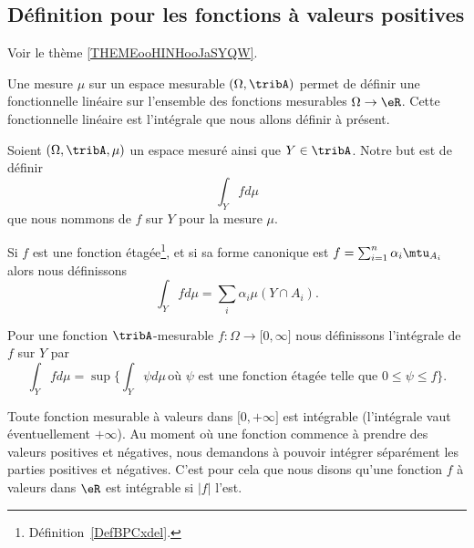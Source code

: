 \subsection{Définition pour les fonctions à valeurs positives}

Voir le thème \ref{THEMEooHINHooJaSYQW}.

Une mesure \( \mu\) sur un espace mesurable \( (\Omega,\tribA)\) permet de définir une fonctionnelle linéaire sur l'ensemble des fonctions mesurables \( \Omega\to \eR\). Cette fonctionnelle linéaire est l'intégrale que nous allons définir à présent.

\begin{definition}  \label{DefTVOooleEst}
	Soient \( (\Omega,\tribA,\mu)\) un espace mesuré ainsi que \( Y\in\tribA\). Notre but est de définir
	\begin{equation}
		\int_Yfd\mu
	\end{equation}
	que nous nommons  de \( f\) sur \( Y\) pour la mesure \( \mu\).
	\begin{subproof}
		Si \( f\) est une fonction étagée\footnote{Définition~\ref{DefBPCxdel}.}, et si sa forme canonique est \( f=\sum_{i=1}^n\alpha_i\mtu_{A_i}\) alors nous définissons
		\begin{equation}        \label{EqooGAFMooZLzjPs}
			\int_Yfd\mu=\sum_i\alpha_i\mu(Y\cap A_i).
		\end{equation}

		Pour une fonction \( \tribA\)-mesurable \( f\colon \Omega\to \mathopen[ 0 , \infty \mathclose]\) nous définissons l'intégrale de \( f\) sur \( Y\) par
		\begin{equation}        \label{EqDefintYfdmu}
			\int_Yfd\mu=\sup\Big\{ \int_Y\psi d\mu\,\text{où } \psi\text{ est une fonction étagée telle que } 0\leq \psi\leq f \Big\}.
		\end{equation}

	\end{subproof}
\end{definition}

\begin{remark}
	Toute fonction mesurable à valeurs dans \(  \mathopen[ 0 , +\infty \mathclose]   \) est intégrable (l'intégrale vaut éventuellement \( +\infty\)). Au moment où une fonction commence à prendre des valeurs positives et négatives, nous demandons à pouvoir intégrer séparément les parties positives et négatives. C'est pour cela que nous disons qu'une fonction \( f\) à valeurs dans \( \eR\) est intégrable si \( | f |\) l'est.
\end{remark}

